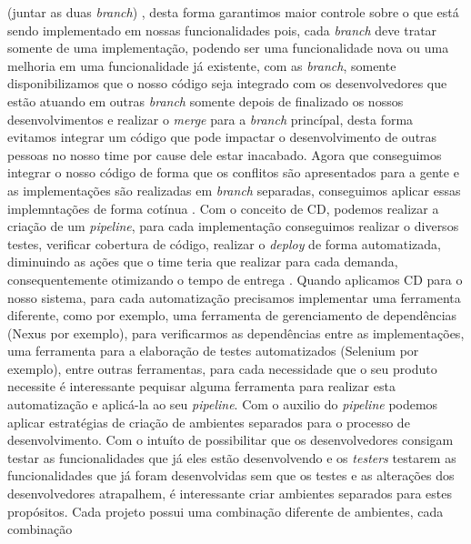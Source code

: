     (juntar as duas \textit{branch}) \cite{ProGit}, desta forma garantimos maior
    controle sobre o que está sendo implementado em nossas funcionalidades pois,
    cada \textit{branch} deve tratar somente de uma implementação, podendo ser
    uma funcionalidade nova ou uma melhoria em uma funcionalidade já existente,
    com as \textit{branch}, somente disponibilizamos que o nosso código seja
    integrado com os desenvolvedores que estão atuando em outras \textit{branch}
    somente depois de finalizado os nossos desenvolvimentos e realizar o \textit{merge}
    para a \textit{branch} princípal, desta forma evitamos integrar um código
    que pode impactar o desenvolvimento de outras pessoas no nosso time por
    cause dele estar inacabado. \newline
    Agora que conseguimos integrar o nosso código de forma que os conflitos são
    apresentados para a gente e as implementações são realizadas em \textit{branch}
    separadas, conseguimos aplicar essas implemntações de forma cotínua
    \cite{TheDevOpsHandbook}. Com o conceito de CD, podemos realizar a criação
    de um \textit{pipeline}, para cada implementação conseguimos realizar o
    diversos testes, verificar cobertura de código, realizar o \textit{deploy}
    de forma automatizada, diminuindo as ações que o time teria que realizar
    para cada demanda, consequentemente otimizando o tempo de entrega
    \cite{ContinuousDelivery}. Quando aplicamos CD para o nosso sistema,
    para cada automatização precisamos implementar uma ferramenta diferente,
    como por exemplo, uma ferramenta de gerenciamento de dependências
    (Nexus por exemplo), para verificarmos as dependências entre as implementações,
    uma ferramenta para a elaboração de testes automatizados (Selenium por exemplo),
    entre outras ferramentas, para cada necessidade que o seu produto necessite
    é interessante pequisar alguma ferramenta para realizar esta automatização
    e aplicá-la ao seu \textit{pipeline}. \newline
    Com o auxilio do \textit{pipeline} podemos aplicar estratégias de criação
    de ambientes separados para o processo de desenvolvimento. Com o intuíto de
    possibilitar que os desenvolvedores consigam testar as funcionalidades que
    já eles estão desenvolvendo e os \textit{testers} testarem as funcionalidades
    que já foram desenvolvidas sem que os testes e as alterações dos desenvolvedores
    atrapalhem, é interessante criar ambientes separados para estes propósitos.
    Cada projeto possui uma combinação diferente de ambientes, cada combinação
